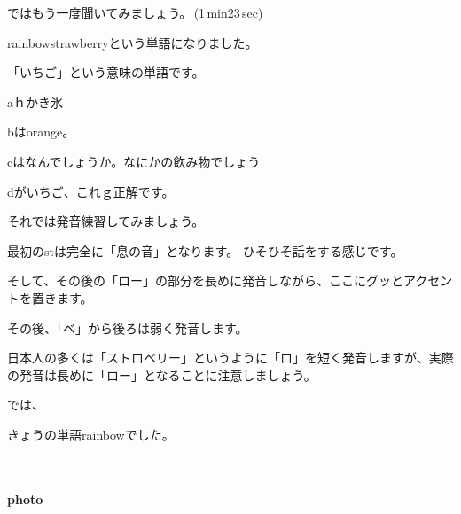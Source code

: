 \documentclass[12pt]{jlreq}
\begin{document}
ではもう一度聞いてみましょう。\faVolumeUp\,(1\,min23\,sec)

rainbowstrawberryという単語になりました。

「いちご」という意味の単語です。

aｈかき氷

bはorange。

cはなんでしょうか。なにかの飲み物でしょう

dがいちご、これｇ正解です。


それでは発音練習してみましょう。

最初のstは完全に「息の音」となります。
ひそひそ話をする感じです。

そして、その後の「ロー」の部分を長めに発音しながら、ここにグッとアクセントを置きます。

その後、「ベ」から後ろは弱く発音します。

日本人の多くは「ストロベリー」というように「ロ」を短く発音しますが、実際の発音は長めに「ロー」となることに注意しましょう。

では、

きょうの単語rainbowでした。

{\large \ComputerMouse}\,\,


\paragraph{photo}
\end{document}
